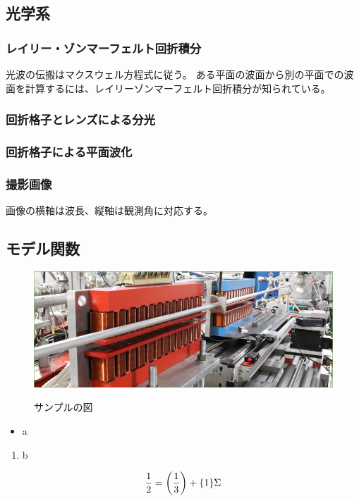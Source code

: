 \documentclass[a4paper,11pt,uplatex]{jsarticle}
\begin{document}
\subsection{光学系}

\subsubsection{レイリー・ゾンマーフェルト回折積分}
光波の伝搬はマクスウェル方程式に従う。
ある平面の波面から別の平面での波面を計算するには、レイリーゾンマーフェルト回折積分が知られている。

\subsubsection{回折格子とレンズによる分光}
\subsubsection{回折格子による平面波化}
\subsubsection{撮影画像}
画像の横軸は波長、縦軸は観測角に対応する。
\subsection{モデル関数}













\clearpage

\begin{figure}[tb]
  \centering
  \includegraphics[width=0.8\linewidth]{image/1-1.jpg}\\
  \caption{サンプルの図}
  \label{sample_image}
\end{figure}

\begin{itemize}
  \item a
\end{itemize}
\begin{enumerate}
  \item b
\end{enumerate}

\begin{align}
\frac{1}{2} = \qty(\frac{1}{3}) + \qty{1}\Sigma
\end{align}
\end{document}
